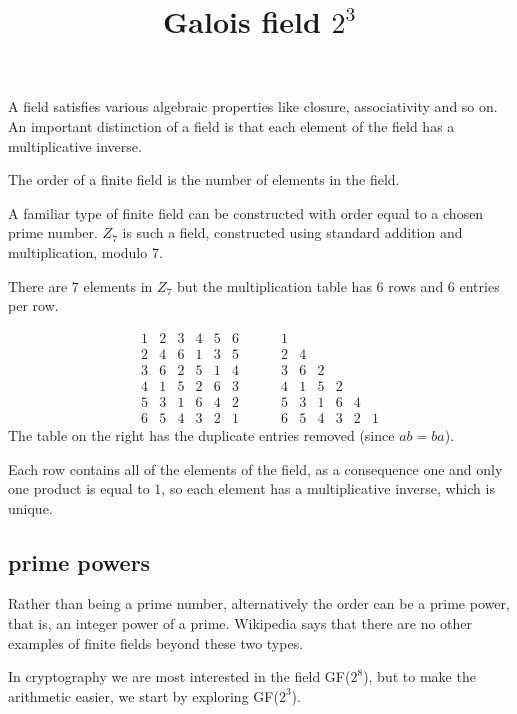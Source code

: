 \documentclass[11pt, oneside]{article}
\title{Galois field $2^3$}
\date{}
\begin{document}
\maketitle
\Large

A field satisfies various algebraic properties like closure, associativity and so on.  An important distinction of a field is that each element of the field has a multiplicative inverse.

The order of a finite field is the number of elements in the field.  

A familiar type of finite field can be constructed with order equal to a chosen prime number.  $Z_7$ is such a field, constructed using standard addition and multiplication, modulo 7.  

There are 7 elements in $Z_7$ but the multiplication table has 6 rows and 6 entries per row.

\[ 
\begin{matrix}
1 & 2 & 3 & 4 & 5 & 6 \\
2 & 4 & 6 & 1 & 3 & 5 \\
3 & 6 & 2 & 5 & 1 & 4 \\
4 & 1 & 5 & 2 & 6 & 3 \\
5 & 3 & 1 & 6 & 4 & 2 \\
6 & 5 & 4 & 3 & 2 & 1
\end{matrix} \ \ \ \ \  \ \ \ \ \
\begin{matrix}
1  \\
2 & 4  \\
3 & 6 & 2 \\
4 & 1 & 5 & 2 \\
5 & 3 & 1 & 6 & 4 \\
6 & 5 & 4 & 3 & 2 & 1
\end{matrix}
\]
The table on the right has the duplicate entries removed (since $ab = ba$).

Each row contains all of the elements of the field, as a consequence one and only one product is equal to $1$, so each element has a multiplicative inverse, which is unique.

\subsection*{prime powers}
Rather than being a prime number, alternatively the order can be a prime power, that is, an integer power of a prime.  Wikipedia says that there are no other examples of finite fields beyond these two types.

In cryptography we are most interested in the field GF($2^8$), but to make the arithmetic easier, we start by exploring GF($2^3$).
\end{document}
